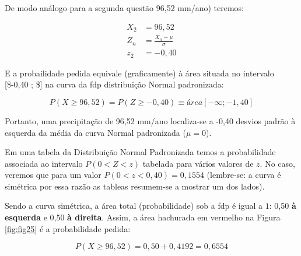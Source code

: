 \documentclass[
]{book}
\begin{document}
\hfill\break

De modo análogo para a segunda questão 96,52 mm/ano) teremos:

\begin{align*}
X_{2} & = 96,52  \\
Z_{n} & = \frac{X_{n} - \mu}{\sigma}\\
z_{2} & = -0,40 
\end{align*}

\hfill\break

E a probailidade pedida equivale (graficamente) à área situada no intervalo {[}\$-0,40 ; \infty \${]} na curva da fdp distribuição Normal padronizada:

\hfill\break

\[
P(X \ge 96,52) = P(Z \ge -0,40) \equiv área[-\infty ; -1,40]
\]

\hfill\break

Portanto, uma precipitação de 96,52 mm/ano localiza-se a -0,40 desvios padrão à esquerda da média da curva Normal padronizada (\(\mu=0\)).

\hfill\break

Em uma tabela da Distribuição Normal Padronizada temos a probabilidade associada ao intervalo \(P(0<Z<z)\) tabelada para vários valores de \(z\). No caso, veremos que para um valor \(P(0<z<0,40)=0,1554\) (lembre-se: a curva é simétrica por essa razão as tableas resumem-se a mostrar um dos lados).

\hfill\break

Sendo a curva simétrica, a área total (probabilidade) sob a fdp é igual a \(1\): 0,50 \textbf{à esquerda} e 0,50 \textbf{à direita}. Assim, a área hachurada em vermelho na Figura \ref{fig:fig25} é a probabilidade pedida:

\hfill\break

\[
P(X \ge 96,52) = 0,50 + 0,4192 = 0,6554
\]

\hfill\break
\end{document}
